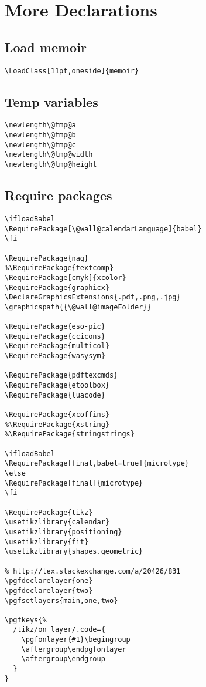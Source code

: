 \documentclass[11pt,oneside]{memoir-article}
\begin{document}
\chapter{More Declarations}
\label{sec:org1544dc5}
\section{Load memoir}
\label{sec:org2d3abb2}

\begin{verbatim}
\LoadClass[11pt,oneside]{memoir}
\end{verbatim}

\section{Temp variables}
\label{sec:orge07ee5a}

\begin{verbatim}
\newlength\@tmp@a
\newlength\@tmp@b
\newlength\@tmp@c
\newlength\@tmp@width
\newlength\@tmp@height
\end{verbatim}

\section{Require packages}
\label{sec:orgd636a69}

\begin{verbatim}
\ifloadBabel
\RequirePackage[\@wall@calendarLanguage]{babel}
\fi

\RequirePackage{nag}
%\RequirePackage{textcomp}
\RequirePackage[cmyk]{xcolor}
\RequirePackage{graphicx}
\DeclareGraphicsExtensions{.pdf,.png,.jpg}
\graphicspath{{\@wall@imageFolder}}

\RequirePackage{eso-pic}
\RequirePackage{ccicons}
\RequirePackage{multicol}
\RequirePackage{wasysym}

\RequirePackage{pdftexcmds}
\RequirePackage{etoolbox}
\RequirePackage{luacode}

\RequirePackage{xcoffins}
%\RequirePackage{xstring}
%\RequirePackage{stringstrings}

\ifloadBabel
\RequirePackage[final,babel=true]{microtype}
\else
\RequirePackage[final]{microtype}
\fi

\RequirePackage{tikz}
\usetikzlibrary{calendar}
\usetikzlibrary{positioning}
\usetikzlibrary{fit}
\usetikzlibrary{shapes.geometric}

% http://tex.stackexchange.com/a/20426/831
\pgfdeclarelayer{one}
\pgfdeclarelayer{two}
\pgfsetlayers{main,one,two}

\pgfkeys{%
  /tikz/on layer/.code={
    \pgfonlayer{#1}\begingroup
    \aftergroup\endpgfonlayer
    \aftergroup\endgroup
  }
}
\end{verbatim}
\end{document}
